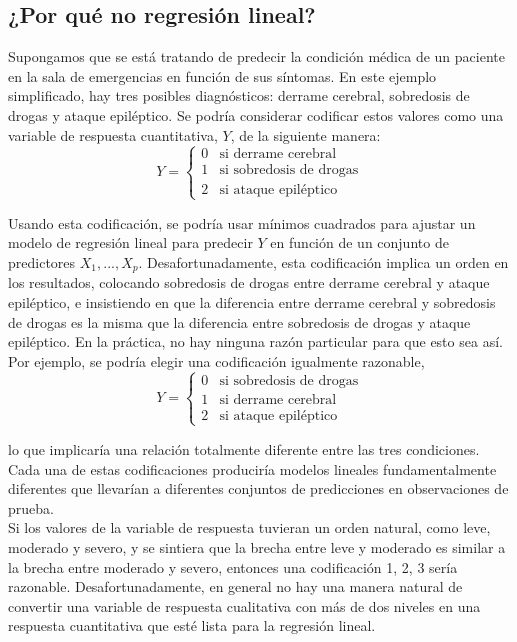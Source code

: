 \subsection{¿Por qué no regresión lineal?}

Supongamos que se está tratando de predecir la condición médica de un paciente en la sala de emergencias en función de sus síntomas. En este ejemplo simplificado, hay tres posibles diagnósticos: derrame cerebral, sobredosis de drogas y ataque epiléptico. Se podría considerar codificar estos valores como una variable de respuesta cuantitativa, $Y$, de la siguiente manera:
\begin{equation*}
Y = 
\begin{cases} 
0 & \text{si derrame cerebral} \\
1 & \text{si sobredosis de drogas} \\
2 & \text{si ataque epiléptico}
\end{cases}
\end{equation*}

Usando esta codificación, se podría usar mínimos cuadrados para ajustar un modelo de regresión lineal para predecir $Y$ en función de un conjunto de predictores $X_1,...,X_p$. Desafortunadamente, esta codificación implica un orden en los resultados, colocando sobredosis de drogas entre derrame cerebral y ataque epiléptico, e insistiendo en que la diferencia entre derrame cerebral y sobredosis de drogas es la misma que la diferencia entre sobredosis de drogas y ataque epiléptico. En la práctica, no hay ninguna razón particular para que esto sea así. Por ejemplo, se podría elegir una codificación igualmente razonable,
\begin{equation*}
Y = 
\begin{cases} 
0 & \text{si sobredosis de drogas} \\
1 & \text{si derrame cerebral} \\
2 & \text{si ataque epiléptico}
\end{cases}
\end{equation*}

lo que implicaría una relación totalmente diferente entre las tres condiciones. Cada una de estas codificaciones produciría modelos lineales fundamentalmente diferentes que llevarían a diferentes conjuntos de predicciones en observaciones de prueba. \\

Si los valores de la variable de respuesta tuvieran un orden natural, como leve, moderado y severo, y se sintiera que la brecha entre leve y moderado es similar a la brecha entre moderado y severo, entonces una codificación 1, 2, 3 sería razonable. Desafortunadamente, en general no hay una manera natural de convertir una variable de respuesta cualitativa con más de dos niveles en una respuesta cuantitativa que esté lista para la regresión lineal. \\

